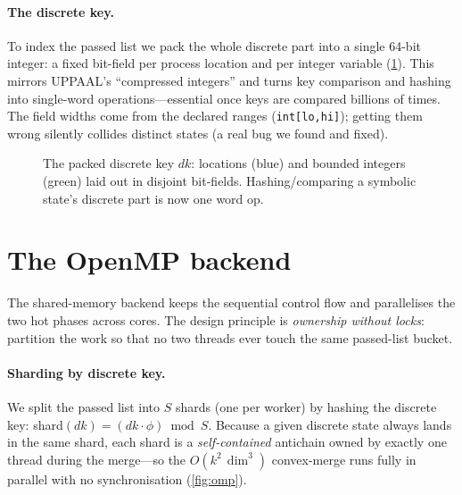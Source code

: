 \documentclass[11pt]{article}
\newcommand{\dk}{\ensuremath{\mathit{dk}}}
\newcommand{\code}[1]{\texttt{\small #1}}
\begin{document}
\paragraph{The discrete key.} To index the passed list we pack the whole discrete part into a
single 64-bit integer: a fixed bit-field per process location and per integer variable
(\cref{fig:key}). This mirrors UPPAAL's ``compressed integers'' and turns key comparison and
hashing into single-word operations---essential once keys are compared billions of times. The
field widths come from the declared ranges (\code{int[lo,hi]}); getting them wrong silently
collides distinct states (a real bug we found and fixed).

\begin{figure}[t]
\centering
{}
\caption{The packed discrete key \dk{}: locations (blue) and bounded integers (green) laid out in
disjoint bit-fields. Hashing/comparing a symbolic state's discrete part is now one word op.}
\label{fig:key}
\end{figure}

\section{The OpenMP backend}\label{sec:omp}
The shared-memory backend keeps the sequential control flow and parallelises the two hot phases
across cores. The design principle is \emph{ownership without locks}: partition the work so that
no two threads ever touch the same passed-list bucket.

\paragraph{Sharding by discrete key.} We split the passed list into $S$ shards (one per worker) by
hashing the discrete key: shard$(\dk) = (\dk \cdot \phi) \bmod S$. Because a given discrete state
always lands in the same shard, each shard is a \emph{self-contained} antichain owned by exactly
one thread during the merge---so the $O(k^2\,\dim^3)$ convex-merge runs fully in parallel with no
synchronisation (\cref{fig:omp}).
\end{document}
